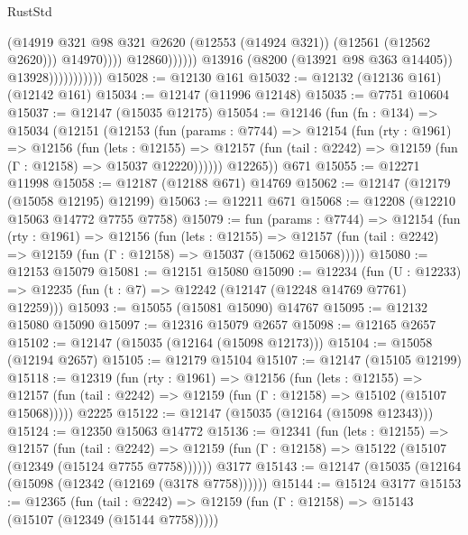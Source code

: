 \begin{lexlean}{RustStd}
\begin{coremodule}
                                              (@14919
                                                @321
                                                @98
                                                @321
                                                @2620
                                                (@12553 (@14924 @321))
                                                (@12561 (@12562 @2620)))
                                              @14970))))
                                      @12860))))))
                          @13916
                          (@8200 (@13921 @98 @363 @14405))
                          @13928)))))))))))
@15028 := @12130 @161
@15032 := @12132 (@12136 @161) (@12142 @161)
@15034 := @12147 (@11996 @12148)
@15035 := @7751 @10604
@15037 := @12147 (@15035 @12175)
@15054 := @12146
    (fun (fn : @134) =>
    @15034
      (@12151
        (@12153
          (fun (params : @7744) =>
          @12154
            (fun (rty : @1961) =>
            @12156
              (fun (lets : @12155) =>
              @12157 (fun (tail : @2242) => @12159 (fun (Γ : @12158) => @15037 @12220))))))
        @12265))
    @671
@15055 := @12271 @11998
@15058 := @12187 (@12188 @671) @14769
@15062 := @12147 (@12179 (@15058 @12195) @12199)
@15063 := @12211 @671
@15068 := @12208 (@12210 @15063 @14772 @7755 @7758)
@15079 := fun (params : @7744) =>
  @12154
    (fun (rty : @1961) =>
    @12156
      (fun (lets : @12155) =>
      @12157 (fun (tail : @2242) => @12159 (fun (Γ : @12158) => @15037 (@15062 @15068)))))
@15080 := @12153 @15079
@15081 := @12151 @15080
@15090 := @12234
    (fun (U : @12233) => @12235 (fun (t : @7) => @12242 (@12147 (@12248 @14769 @7761) @12259)))
@15093 := @15055 (@15081 @15090) @14767
@15095 := @12132 @15080 @15090
@15097 := @12316 @15079 @2657
@15098 := @12165 @2657
@15102 := @12147 (@15035 (@12164 (@15098 @12173)))
@15104 := @15058 (@12194 @2657)
@15105 := @12179 @15104
@15107 := @12147 (@15105 @12199)
@15118 := @12319
    (fun (rty : @1961) =>
    @12156
      (fun (lets : @12155) =>
      @12157 (fun (tail : @2242) => @12159 (fun (Γ : @12158) => @15102 (@15107 @15068)))))
    @2225
@15122 := @12147 (@15035 (@12164 (@15098 @12343)))
@15124 := @12350 @15063 @14772
@15136 := @12341
    (fun (lets : @12155) =>
    @12157
      (fun (tail : @2242) =>
      @12159 (fun (Γ : @12158) => @15122 (@15107 (@12349 (@15124 @7755 @7758))))))
    @3177
@15143 := @12147 (@15035 (@12164 (@15098 (@12342 (@12169 (@3178 @7758))))))
@15144 := @15124 @3177
@15153 := @12365
    (fun (tail : @2242) => @12159 (fun (Γ : @12158) => @15143 (@15107 (@12349 (@15144 @7758)))))

\end{coremodule}
\end{lexlean}
